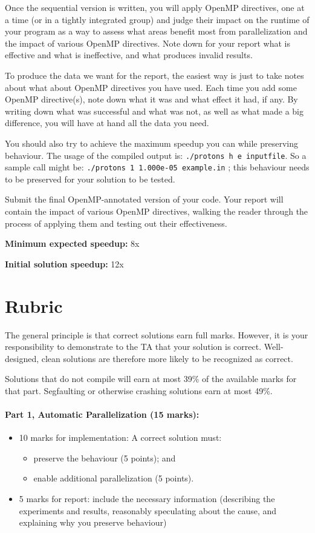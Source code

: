 \documentclass[letterpaper,10pt]{article}
\begin{document}
Once the sequential version is written, you will apply OpenMP directives, one at a time (or in a tightly integrated group) and judge their impact on the runtime of your program as a way to assess what areas benefit most from parallelization and the impact of various OpenMP directives. Note down for your report what is effective and what is ineffective, and what produces invalid results. 

To produce the data we want for the report, the easiest way is just to take notes about what about OpenMP directives you have used. Each time you add some OpenMP directive(s), note down what it was and what effect it had, if any. By writing down what was successful and what was not, as well as what made a big difference, you will have at hand all the data you need.

You should also try to achieve the maximum speedup you can while preserving behaviour. The usage of the compiled output is: \texttt{./protons h e inputfile}. So a sample call might be: \texttt{./protons 1 1.000e-05 example.in} ; this behaviour needs to be preserved for your solution to be tested.

Submit the final OpenMP-annotated version of your code. Your report will contain the impact of various OpenMP directives, walking the reader through the process of applying them and testing out their effectiveness.

\squishlist
  \item {\bf Minimum expected speedup:} 8x
  \item {\bf Initial solution speedup:} 12x
\squishend


\section*{Rubric}

The general principle is that correct solutions earn full marks.
However, it is your responsibility to demonstrate to the TA
that your solution is correct. Well-designed, clean solutions 
are therefore more likely to be recognized as correct. 

Solutions that do not compile will earn at most 39\% of the available
marks for that part. Segfaulting or otherwise crashing solutions earn
at most 49\%.

\paragraph{Part 1, Automatic Parallelization (15 marks):}  
\begin{itemize}
\item 10 marks for implementation: A correct solution must:
\begin{itemize}
	\item preserve the behaviour (5 points); and
	\item enable additional parallelization (5 points).
\end{itemize}
 
\item 5 marks for report: include the necessary information
(describing the experiments and results, reasonably speculating about
the cause, and explaining why you preserve behaviour)
\end{itemize}
\end{document}
